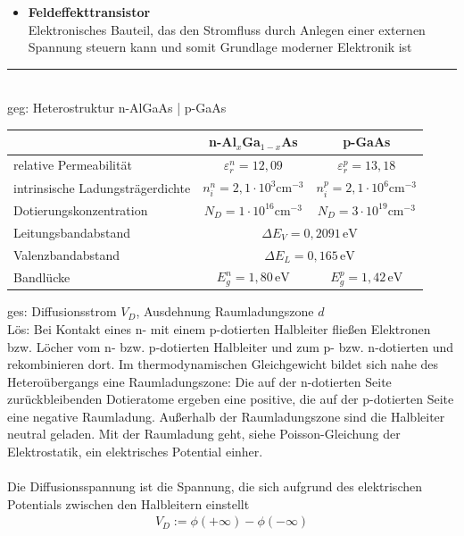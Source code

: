 \documentclass{article}
\begin{document}
	\begin{itemize}
		\item \textbf{Feldeffekttransistor}\\
		Elektronisches Bauteil, das den Stromfluss durch Anlegen einer externen Spannung steuern kann und somit Grundlage moderner Elektronik ist
	\end{itemize}


\newpage


{\color{blue}
\hrule
	\\
	geg: Heterostruktur n-AlGaAs | p-GaAs
		\begin{table}[h]
			\centering
			\begin{tabular}{l|c|c}
				\hline\hline
					& n-Al$_x$Ga$_{1-x}$As & p-GaAs \\
				\hline
					relative Permeabilität & $\varepsilon_r^n = 12,09$ & $\varepsilon_r^p = 13,18$ \\
				\hline
					intrinsische Ladungsträgerdichte & $n_i^n = 2,1 \cdot 10^3 \text{cm}^{-3}$ & $n_i^p = 2,1 \cdot 10^6 \text{cm}^{-3}$ \\
				\hline
					Dotierungskonzentration & $N_D = 1 \cdot 10^{16} \text{cm}^{-3}$ & $N_D = 3 \cdot 10^{19} \text{cm}^{-3}$ \\
				\hline
					Leitungsbandabstand & \multicolumn{2}{c}{$\Delta E_V = 0,2091 \, \text{eV}$} \\
				\hline
					Valenzbandabstand & \multicolumn{2}{c}{$\Delta E_L = 0,165 \, \text{eV}$} \\
				\hline
					Bandlücke & $E_g^n = 1,80 \, \text{eV}$ & $E_g^p = 1,42 \, \text{eV}$ \\
				\hline\hline
			\end{tabular}
		\end{table}
	
	ges: Diffusionsstrom $V_D$, Ausdehnung Raumladungszone $d$ \\
	Lös: Bei Kontakt eines n- mit einem p-dotierten Halbleiter fließen Elektronen bzw. Löcher vom n- bzw. p-dotierten Halbleiter und zum p- bzw. n-dotierten und rekombinieren dort. Im thermodynamischen Gleichgewicht bildet sich nahe des Heteroübergangs eine Raumladungszone: Die auf der n-dotierten Seite zurückbleibenden Dotieratome ergeben eine positive, die auf der p-dotierten Seite eine negative Raumladung. Außerhalb der Raumladungszone sind die Halbleiter neutral geladen. Mit der Raumladung geht, siehe Poisson-Gleichung der Elektrostatik, ein elektrisches Potential einher.\\
	\\
	Die Diffusionsspannung ist die Spannung, die sich aufgrund des elektrischen Potentials zwischen den Halbleitern einstellt
		\begin{align*}
			V_D := \phi(+\infty) - \phi(-\infty) 
		\end{align*}
	
}
\end{document}
